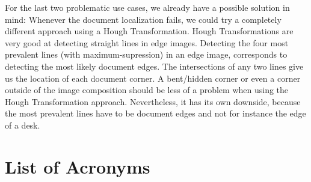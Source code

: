 \documentclass[bibliography=totoc]{scrartcl}
\begin{document}
	For the last two problematic use cases, we already have a possible solution in mind: 
	Whenever the document localization fails, we could try a completely different approach using a Hough Transformation. 
	Hough Transformations are very good at detecting straight lines in edge images. 
	Detecting the four most prevalent lines (with maximum-supression) in an edge image, corresponds to detecting the most likely document edges.
	The intersections of any two lines give us the location of each document corner. 
	A bent/hidden corner or even a corner outside of the image composition should be less of a problem when using the Hough Transformation approach.
	Nevertheless, it has its own downside, because the most prevalent lines have to be document edges and not for instance the edge of a desk.


\section*{List of Acronyms} 

\begin{acronym}[....]
\end{acronym}
			

\end{document}
